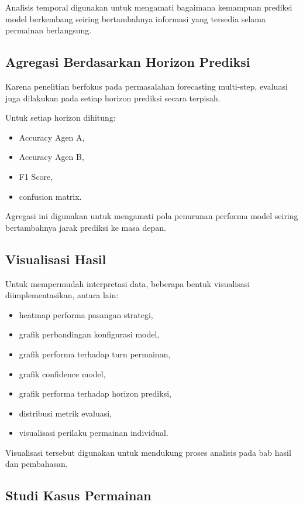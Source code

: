 Analisis temporal digunakan untuk mengamati bagaimana kemampuan prediksi model berkembang seiring bertambahnya informasi yang tersedia selama permainan berlangsung.

\subsection{Agregasi Berdasarkan Horizon Prediksi}

Karena penelitian berfokus pada permasalahan forecasting multi-step, evaluasi juga dilakukan pada setiap horizon prediksi secara terpisah.

Untuk setiap horizon dihitung:

\begin{itemize}
\item Accuracy Agen A,
\item Accuracy Agen B,
\item F1 Score,
\item confusion matrix.
\end{itemize}

Agregasi ini digunakan untuk mengamati pola penurunan performa model seiring bertambahnya jarak prediksi ke masa depan.

\subsection{Visualisasi Hasil}

Untuk mempermudah interpretasi data, beberapa bentuk visualisasi diimplementasikan, antara lain:

\begin{itemize}
\item heatmap performa pasangan strategi,
\item grafik perbandingan konfigurasi model,
\item grafik performa terhadap turn permainan,
\item grafik confidence model,
\item grafik performa terhadap horizon prediksi,
\item distribusi metrik evaluasi,
\item visualisasi perilaku permainan individual.
\end{itemize}

Visualisasi tersebut digunakan untuk mendukung proses analisis pada bab hasil dan pembahasan.

\subsection{Studi Kasus Permainan}

